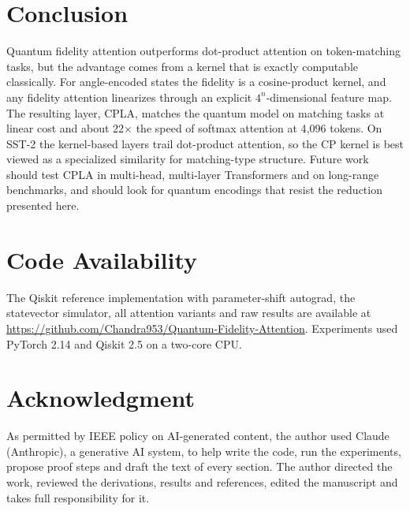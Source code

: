 \documentclass[conference]{IEEEtran}
\newcommand{\cpla}{CPLA}
\begin{document}
\section{Conclusion}

Quantum fidelity attention outperforms dot-product attention on token-matching tasks, but the advantage comes from a kernel that is exactly computable classically. For angle-encoded states the fidelity is a cosine-product kernel, and any fidelity attention linearizes through an explicit $4^n$-dimensional feature map. The resulting layer, \cpla, matches the quantum model on matching tasks at linear cost and about 22$\times$ the speed of softmax attention at 4{,}096 tokens. On SST-2 the kernel-based layers trail dot-product attention, so the CP kernel is best viewed as a specialized similarity for matching-type structure. Future work should test \cpla{} in multi-head, multi-layer Transformers and on long-range benchmarks, and should look for quantum encodings that resist the reduction presented here.

\section*{Code Availability}
The Qiskit reference implementation with parameter-shift autograd, the statevector simulator, all attention variants and raw results are available at \url{https://github.com/Chandra953/Quantum-Fidelity-Attention}.
Experiments used PyTorch 2.14 and Qiskit 2.5 on a two-core CPU.

\section*{Acknowledgment}
As permitted by IEEE policy on AI-generated content, the author used Claude (Anthropic), a generative AI system, to help write the code, run the experiments, propose proof steps and draft the text of every section. The author directed the work, reviewed the derivations, results and references, edited the manuscript and takes full responsibility for it.



\end{document}
